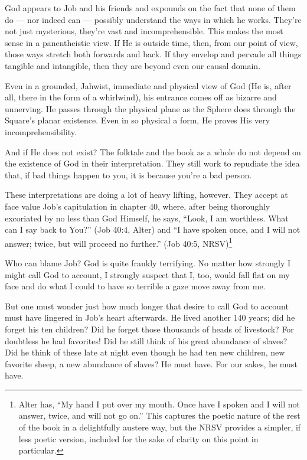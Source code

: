God appears to Job and his friends and expounds on the fact that none of them do --- nor indeed can --- possibly understand the ways in which he works. They're not just mysterious, they're vast and incomprehensible. This makes the most sense in a panentheistic view. If He is outside time, then, from our point of view, those ways stretch both forwards and back. If they envelop and pervade all things tangible and intangible, then they are beyond even our causal domain.

Even in a grounded, Jahwist, immediate and physical view of God (He is, after all, there in the form of a whirlwind), his entrance comes off as bizarre and unnerving. He passes through the physical plane as the Sphere does through the Square's planar existence. Even in so physical a form, He proves His very incomprehensibility.

And if He does not exist? The folktale and the book as a whole do not depend on the existence of God in their interpretation. They still work to repudiate the idea that, if bad things happen to you, it is because you're a bad person.

These interpretations are doing a lot of heavy lifting, however. They accept at face value Job's capitulation in chapter 40, where, after being thoroughly excoriated by no less than God Himself, he says, ``Look, I am worthless. What can I say back to You?'' (Job 40:4, Alter) and ``I have spoken once, and I will not answer; twice, but will proceed no further.'' (Job 40:5, NRSV)\footnote{Alter has, ``My hand I put over my mouth. Once have I spoken and I will not answer, twice, and will not go on.'' This captures the poetic nature of the rest of the book in a delightfully austere way, but the NRSV provides a simpler, if less poetic version, included for the sake of clarity on this point in particular.}

Who can blame Job? God is quite frankly terrifying. No matter how strongly I might call God to account, I strongly suspect that I, too, would fall flat on my face and do what I could to have so terrible a gaze move away from me.

But one must wonder just how much longer that desire to call God to account must have lingered in Job's heart afterwards. He lived another 140 years; did he forget his ten children? Did he forget those thousands of heads of livestock? For doubtless he had favorites! Did he still think of his great abundance of slaves? Did he think of these late at night even though he had ten new children, new favorite sheep, a new abundance of slaves? He must have. For our sakes, he must have.

